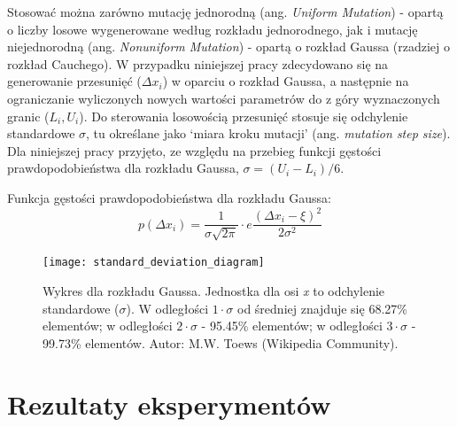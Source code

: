 \documentclass[a4paper,11pt]{article}
\begin{document}
    \bigskip

    Stosować można zarówno mutację jednorodną (ang. \textit{Uniform Mutation}) - opartą o liczby losowe wygenerowane według rozkładu jednorodnego, jak i mutację niejednorodną (ang. \textit{Nonuniform Mutation}) - opartą o rozkład Gaussa (rzadziej o rozkład Cauchego)\cite{IntroductionToEvolutionaryComputing2015}. W przypadku niniejszej pracy zdecydowano się na generowanie przesunięć ($\Delta x_{i}$) w oparciu o rozkład Gaussa, a następnie na ograniczanie wyliczonych nowych wartości parametrów do z góry wyznaczonych granic ($L_{i}, U_{i}$). Do sterowania losowością przesunięć stosuje się odchylenie standardowe $\sigma$, tu określane jako `miara kroku mutacji' (ang. \textit{mutation step size}). Dla niniejszej pracy przyjęto, ze względu na przebieg funkcji gęstości prawdopodobieństwa dla rozkładu Gaussa, $\sigma = (U_{i} - L_{i}) / 6$.

    \bigskip

    \noindent
    \begin{minipage}[H]{\textwidth}
        \setlength\parindent{17pt} Funkcja gęstości prawdopodobieństwa dla rozkładu Gaussa: \\
        \begin{equation}
            \label{eq:mutation_probability distribution}
            p(\Delta x_{i}) = \frac{1}{\sigma \sqrt {2 \pi}} \cdot e \frac{(\Delta x_{i} - \xi)^{2}}{2 \sigma^{2}}
        \end{equation}
    \end{minipage}

    \bigskip

    \begin{figure}[H]
        \label{fig:standard_deviation_diagram}
        \centering
        \texttt{[image: standard\_deviation\_diagram]}
        \caption{Wykres dla rozkładu Gaussa. Jednostka dla osi \textit{x} to odchylenie standardowe ($\sigma$). W odległości $1 \cdot \sigma$ od średniej znajduje się 68.27\% elementów; w odległości $2 \cdot \sigma$ - 95.45\% elementów; w odległości $3 \cdot \sigma$ - 99.73\% elementów. Autor: M.W. Toews (Wikipedia Community).}
    \end{figure}


    \section{Rezultaty eksperymentów}
\end{document}
